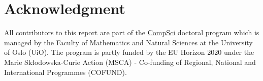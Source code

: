 \section{Acknowledgment} \label{subsec:acknowledgement}
All contributors to this report are part of the \href{https://www.mn.uio.no/compsci/english/}{CompSci} doctoral program which is managed by the Faculty of Mathematics and Natural Sciences at the University of Oslo (UiO).
The program is partly funded by the EU Horizon 2020 under the Marie Skłodowska-Curie Action (MSCA) - Co-funding of Regional, National and International Programmes (COFUND).